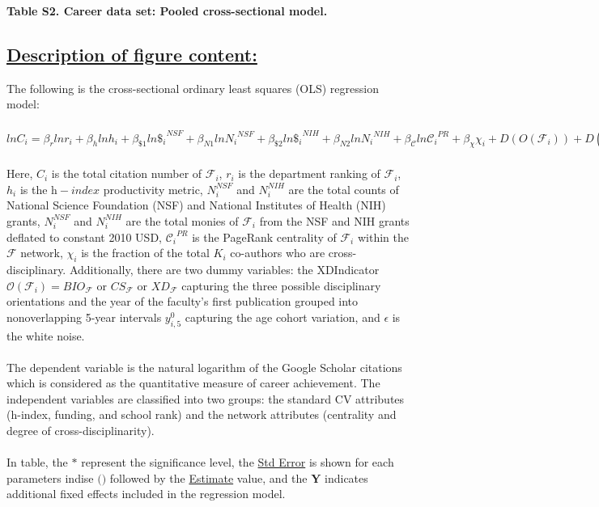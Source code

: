 \documentclass{article}\usepackage[]{graphicx}\usepackage[]{color}
\begin{document}
\begin{center}
\par{\textbf{Table S2. Career data set: Pooled cross-sectional model.}}
\end{center}
\subsection*{\underline{Description of figure content:}}
\par{
The following is the cross-sectional ordinary least squares (OLS) regression model:
\\\\ $lnC_i = {{\beta}_r}ln{r_i} + {{\beta}_h}ln{h_i} + {{\beta}_{\$1}}ln{{\$_i}^{NSF}} + {{\beta}_{N1}}ln{{N_i}^{NSF}} + {{\beta}_{\$2}}ln{{\$_i}^{NIH}} + {{\beta}_{N2}}ln{{N_i}^{NIH}} + {{\beta}_{\mathscr{C}}}ln{{\mathscr{C}_i}^{PR}} + {{\beta}_{\chi}}{{\chi}_i} + D(O(\mathcal{F}_i)) + D(y_{i,5}^0) + {\beta}_o + \epsilon $ \\\\
Here, $C_i$ is the total citation number of $\mathcal{F}_i$, $r_i$ is the department ranking of $\mathcal{F}_i$, $h_i$ is the $\textit{h}-index$ productivity metric, $N_i^{NSF}$ and $N_i^{NIH}$ are the total counts of National Science Foundation (NSF) and National Institutes of Health (NIH) grants, $N_i^{NSF}$ and $N_i^{NIH}$ are the total monies of $\mathcal{F}_i$ from the NSF and NIH grants deflated to constant 2010 USD, ${\mathscr{C}_i}^{PR}$ is the PageRank centrality of $\mathcal{F}_i$ within the $\mathcal{F}$ network, $\chi_i$ is the fraction of the total $K_i$ co-authors who are cross-disciplinary. Additionally, there are two dummy variables: the XDIndicator $\mathscr{O}(\mathcal{F}_i) = BIO_\mathcal{F}$ or $CS_\mathcal{F}$ or $XD_\mathcal{F}$ capturing the three possible disciplinary orientations and the year of the faculty’s first publication grouped into nonoverlapping 5-year intervals $y_{i,5}^0$ capturing the age cohort variation, and $\epsilon$ is the white noise. \\\\
The dependent variable is the natural logarithm of the Google Scholar citations which is considered as the quantitative measure of career achievement. The independent variables are classified into two groups: the standard CV attributes (h-index, funding, and school rank) and the network attributes (centrality and degree of cross-disciplinarity). \\\\
In table, the $\textbf{*}$ represent the significance level, the \underline{Std Error} is shown for each parameters indise $\textbf{()}$ followed by the \underline{Estimate} value, and the $\textbf{Y}$ indicates additional fixed effects included in the regression model.
}
\end{document}
